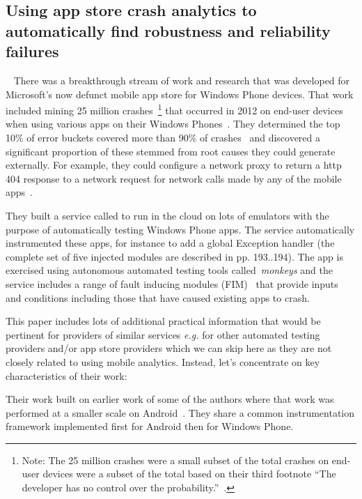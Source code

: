 \subsection{Using app store crash analytics to automatically find robustness and reliability failures}~\label{rw-windows-phone-store-crash-analysis-section}
There was a breakthrough stream of work and research that was developed for Microsoft's now defunct mobile app store for Windows Phone devices. That work included mining 25 million crashes~\footnote{Note: The 25 million crashes were a small subset of the total crashes on end-user devices were a subset of the total based on their third footnote ``The developer has no control over the probability.''~\cite[p. 191]{ravindrath2014_automatic_and_scalable_fault_detection_for_mobile_apps}.} that occurred in 2012 on end-user devices when using various apps on their Windows Phones~. They determined the top 10\% of error buckets covered more than 90\% of crashes~ and discovered a significant proportion of these stemmed from root causes they could generate externally. For example, they could configure a network proxy to return a \Gls{http} 404 response to a network request for network calls made by any of the mobile apps~.

They built a service called  to run in the cloud on lots of  emulators with the purpose of automatically testing Windows Phone apps. The service automatically instrumented these apps, for instance to add a global Exception handler (the complete set of five injected modules are described in pp. 193..194). The app is exercised using autonomous automated testing tools called~\emph{monkeys} and the service includes a range of fault inducing modules (FIM)~ that provide inputs and conditions including those that have caused existing apps to crash. 

This paper includes lots of additional practical information that would be pertinent for providers of similar services \emph{e.g.} for other automated testing providers and/or app store providers which we can skip here as they are not closely related to using mobile analytics. Instead, let's concentrate on key characteristics of their work:

Their work built on earlier work of some of the authors where that work was performed at a smaller scale on Android~. They share a common instrumentation framework implemented first for Android then for Windows Phone.


